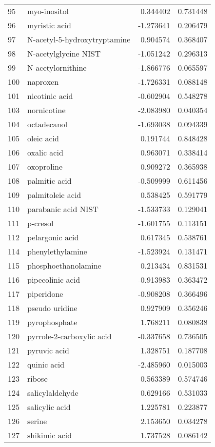 \begin{tabular}{llrr}
95 & myo-inositol & 0.344402 & 0.731448 \\
96 & myristic acid & -1.273641 & 0.206479 \\
97 & N-acetyl-5-hydroxytryptamine & 0.904574 & 0.368407 \\
98 & N-acetylglycine NIST & -1.051242 & 0.296313 \\
99 & N-acetylornithine & -1.866776 & 0.065597 \\
100 & naproxen & -1.726331 & 0.088148 \\
101 & nicotinic acid & -0.602904 & 0.548278 \\
103 & nornicotine & -2.083980 & 0.040354 \\
104 & octadecanol & -1.693038 & 0.094339 \\
105 & oleic acid & 0.191744 & 0.848428 \\
106 & oxalic acid & 0.963071 & 0.338414 \\
107 & oxoproline & 0.909272 & 0.365938 \\
108 & palmitic acid & -0.509999 & 0.611456 \\
109 & palmitoleic acid & 0.538425 & 0.591779 \\
110 & parabanic acid NIST & -1.533733 & 0.129041 \\
111 & p-cresol & -1.601755 & 0.113151 \\
112 & pelargonic acid & 0.617345 & 0.538761 \\
114 & phenylethylamine & -1.523924 & 0.131471 \\
115 & phosphoethanolamine & 0.213434 & 0.831531 \\
116 & pipecolinic acid & -0.913983 & 0.363472 \\
117 & piperidone & -0.908208 & 0.366496 \\
118 & pseudo uridine & 0.927909 & 0.356246 \\
119 & pyrophosphate & 1.768211 & 0.080838 \\
120 & pyrrole-2-carboxylic acid & -0.337658 & 0.736505 \\
121 & pyruvic acid & 1.328751 & 0.187708 \\
122 & quinic acid & -2.485960 & 0.015003 \\
123 & ribose & 0.563389 & 0.574746 \\
124 & salicylaldehyde & 0.629166 & 0.531033 \\
125 & salicylic acid & 1.225781 & 0.223877 \\
126 & serine & 2.153650 & 0.034278 \\
127 & shikimic acid & 1.737528 & 0.086142 \\

\end{tabular}
